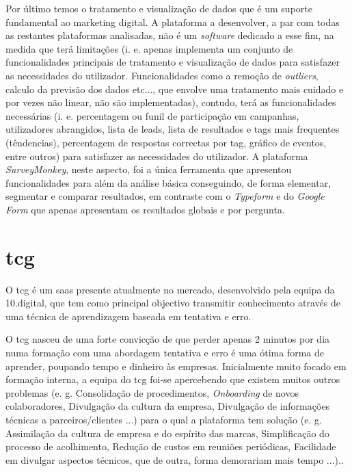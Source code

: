 Por último temos o tratamento e visualização de dados que é um suporte fundamental ao marketing digital. A plataforma a desenvolver, a par com todas as restantes plataformas analisadas, não é um \textit{software} dedicado a esse fim, na medida que terá limitações (i. e. apenas implementa um conjunto de funcionalidades principais de tratamento e visualização de dados para satisfazer as necessidades do utilizador. Funcionalidades como a remoção de \textit{outliers}, calculo da previsão dos dados etc..., que envolve uma tratamento mais cuidado e por vezes não linear, não são implementadas), contudo, terá as funcionalidades necessárias (i. e. percentagem ou funil de participação em campanhas, utilizadores abrangidos, lista de leads, lista de resultados e tags mais frequentes (têndencias), percentagem de respostas correctas por tag, gráfico de eventos, entre outros) para satisfazer as necessidades do utilizador. A plataforma \textit{SurveyMonkey}, neste aspecto, foi a única ferramenta que apresentou funcionalidades para além da análise básica conseguindo, de forma elementar, segmentar e comparar resultados, em contraste com o \textit{Typeform} e do \textit{Google Form} que apenas apresentam os resultados globais e por pergunta.

\section{\acrfull{tcg}}
\label{sec:TCGM}

O \acrlong{tcg} é um \acrshort{saas} presente atualmente no mercado, desenvolvido pela equipa da 10.digital, que tem como principal objectivo transmitir conhecimento através de uma técnica de aprendizagem baseada em tentativa e erro.


O \acrshort{tcg} nasceu de uma forte convicção de que perder apenas 2 minutos por dia numa formação com uma abordagem tentativa e erro é uma ótima forma de aprender, poupando tempo e dinheiro às empresas. Inicialmente muito focado em formação interna, a equipa do \acrshort{tcg} foi-se apercebendo que existem muitos outros problemas (e. g. Consolidação de procedimentos, \textit{Onboarding} de novos colaboradores, Divulgação da cultura da empresa, Divulgação de informações técnicas a parceiros/clientes ...) para o qual a plataforma tem solução (e. g. Assimilação da cultura de empresa e do espírito das marcas, Simplificação do processo de acolhimento, Redução de custos em reuniões periódicas, Facilidade em divulgar aspectos técnicos, que de outra, forma demorariam mais tempo ...).\cite{tcginfo}. 

